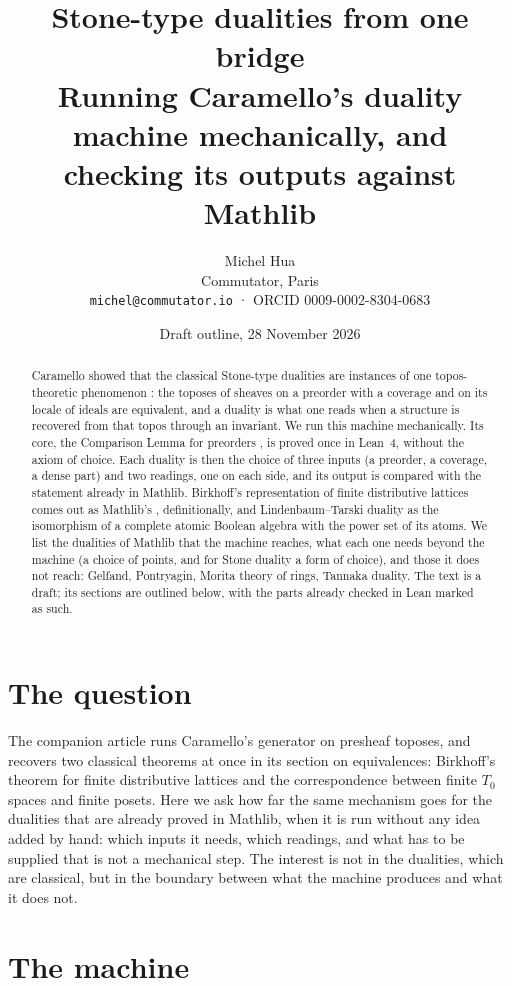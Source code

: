 \documentclass[11pt]{article}
\title{Stone-type dualities from one bridge\\[0.3em] \large Running Caramello's duality machine mechanically, and checking its outputs against Mathlib}
\author{Michel Hua\\ \small Commutator, Paris\\ \small\texttt{michel@commutator.io} · ORCID 0009-0002-8304-0683}
\date{Draft outline, 28 November 2026}
\begin{document}
\maketitle

\begin{abstract}
Caramello showed that the classical Stone-type dualities are instances of one topos-theoretic
phenomenon \cite{caramello-stone}: the toposes of sheaves on a preorder with a coverage and on
its locale of ideals are equivalent, and a duality is what one reads when a structure is
recovered from that topos through an invariant. We run this machine mechanically. Its core, the
Comparison Lemma for preorders \cite[Thm.~10.13(i)]{caramello-stone}, is proved once in Lean~4,
without the axiom of choice. Each duality is then the choice of three inputs (a preorder, a
coverage, a dense part) and two readings, one on each side, and its output is compared with the
statement already in Mathlib. Birkhoff's representation of finite distributive lattices comes out
as Mathlib's , definitionally, and Lindenbaum--Tarski duality as
the isomorphism of a complete atomic Boolean algebra with the power set of its atoms. We list the
dualities of Mathlib that the machine reaches, what each one needs beyond the machine (a choice of
points, and for Stone duality a form of choice), and those it does not reach: Gelfand,
Pontryagin, Morita theory of rings, Tannaka duality. The text is a draft; its sections are
outlined below, with the parts already checked in Lean marked as such.
\end{abstract}

\section{The question}\label{sec:intro}
The companion article \cite{bridges-generator} runs Caramello's generator on presheaf toposes,
and recovers two classical theorems at once in its section on equivalences: Birkhoff's theorem
for finite distributive lattices and the correspondence between finite $T_0$ spaces and finite
posets. Here we ask how far the same mechanism goes for the dualities that are already proved in
Mathlib, when it is run without any idea added by hand: which inputs it needs, which readings,
and what has to be supplied that is not a mechanical step. The interest is not in the dualities,
which are classical, but in the boundary between what the machine produces and what it does not.

\section{The machine}\label{sec:machine}
\end{document}
